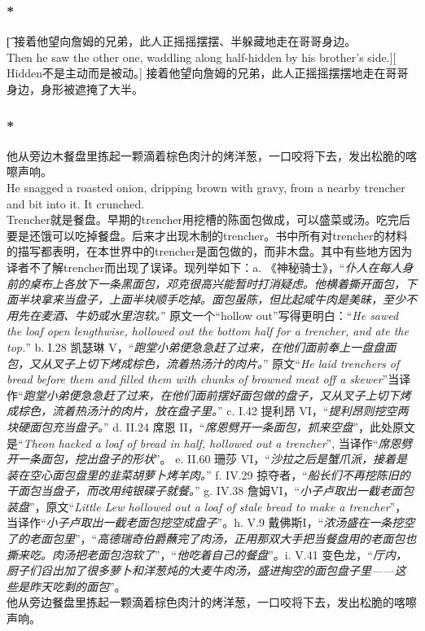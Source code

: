 \documentclass[12pt,a4paper]{article}
\newcommand{\h}[1]{{\color{red}#1}\\}
\newcommand{\la}[1]{{\color{blue}#1}\\}
\begin{document}
\subsubsection{\color{red}*}\t[
	接着他望向詹姆的兄弟，此人正摇摇摆摆、半躲藏地走在哥哥身边。\\
	Then he saw the other one, waddling along half-hidden by his brother's side.][
	Hidden不是主动而是被动。]
	接着他望向詹姆的兄弟，此人正摇摇摆摆地走在哥哥身边，身形被遮掩了大半。
	
\subsubsection{\color{red}*}\label{1.5.1}
\la{他从旁边木餐盘里拣起一颗滴着棕色肉汁的烤洋葱，一口咬将下去，发出松脆的喀嚓声响。\\
He snagged a roasted onion, dripping brown with gravy, from a nearby trencher and bit into it. It crunched.}
\h{Trencher就是餐盘。早期的trencher用挖槽的陈面包做成，可以盛菜或汤。吃完后要是还饿可以吃掉餐盘。后来才出现木制的trencher。书中所有对trencher的材料的描写都表明，在本世界中的trencher是面包做的，而非木盘。其中有些地方因为译者不了解trencher而出现了误译。现列举如下：a. 《神秘骑士》，“\emph{仆人在每人身前的桌布上各放下一条黑面包，邓克很高兴能暂时打消疑虑。他横着撕开面包，下面半块拿来当盘子，上面半块顺手吃掉。面包虽陈，但比起咸牛肉是美昧，至少不用先在麦酒、牛奶或水里泡软。}” 原文一个“hollow out”写得更明白：“\emph{He sawed the loaf open lengthwise, hollowed out the bottom half for a trencher, and ate the top.}” b. I.28 凯瑟琳 V，“\emph{跑堂小弟便急急赶了过来，在他们面前奉上一盘盘面包，又从叉子上切下烤成棕色，流着热汤汁的肉片。}” 原文“\emph{He laid trenchers of bread before them and filled them with chunks of browned meat off a skewer}”当译作“\emph{跑堂小弟便急急赶了过来，在他们面前摆好面包做的盘子，又从叉子上切下烤成棕色，流着热汤汁的肉片，放在盘子里。}” c. I.42 提利昂 VI，“\emph{提利昂则挖空两块硬面包充当盘子。}” d. II.24 席恩 II，“\emph{席恩劈开一条面包，抓来空盘}”，此处原文是“\emph{Theon hacked a loaf of bread in half, hollowed out a trencher}”, 当译作“\emph{席恩劈开一条面包，挖出盘子的形状}”。 e. II.60 珊莎 VI，“\emph{沙拉之后是蟹爪派，接着是装在空心面包盘里的韭菜胡萝卜烤羊肉。}” f. IV.29 掠夺者，“\emph{船长们不再挖陈旧的干面包当盘子，而改用纯银碟子就餐。}” g. IV.38 詹姆VI，“\emph{小子卢取出一截老面包装盘}”，原文“\emph{Little Lew hollowed out a loaf of stale bread to make a trencher}”，当译作“\emph{小子卢取出一截老面包挖空成盘子}”。h. V.9 戴佛斯I，“\emph{浓汤盛在一条挖空了的老面包里}”，“\emph{高德瑞奇伯爵蘸完了肉汤，正用那双大手把当餐盘用的老面包也撕来吃。肉汤把老面包泡软了}”，“\emph{他吃着自己的餐盘}”。i. V.41 变色龙，“\emph{厅内，厨子们舀出加了很多萝卜和洋葱炖的大麦牛肉汤，盛进掏空的面包盘子里——这些是昨天吃剩的面包}”。}
他从旁边餐盘里拣起一颗滴着棕色肉汁的烤洋葱，一口咬将下去，发出松脆的喀嚓声响。
\end{document}
